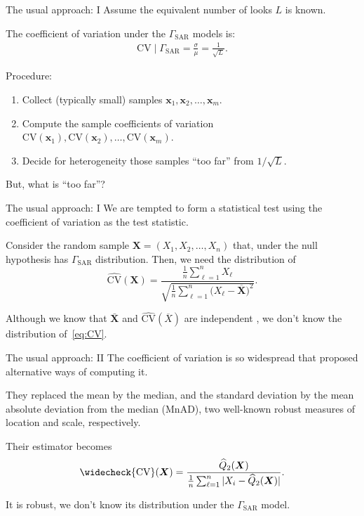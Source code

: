 \documentclass[table,aspectratio=169]{beamer}
\begin{document}
\begin{frame}{The usual approach: I}
Assume the equivalent number of looks $L$ is known.

The coefficient of variation under the $\Gamma_{\text{SAR}}$ models is:
\begin{align}
	\text{CV}\mid \Gamma_{\text{SAR}} =
	\frac{\sigma}{\mu} =
	 \frac{1}{\sqrt{L}}.
\end{align}

Procedure:
\begin{enumerate}
	\item Collect (typically small) samples $\bm x_1, \bm x_2, \dots, \bm x_m$.
	\item Compute the sample coefficients of variation $\text{CV}(\bm x_1),\text{CV}(\bm x_2), \dots, \text{CV}(\bm x_m)$.
	\item Decide for heterogeneity those samples ``too far'' from $1/\sqrt{L}$.
\end{enumerate}

But, what is ``too far''?
\end{frame}


\begin{frame}{The usual approach: I}
We are tempted to form a statistical test using the coefficient of variation as the test statistic.

Consider the random sample $\bm X=(X_1,X_2,\dots,X_n)$ that, under the null hypothesis has $\Gamma_{\text{SAR}}$ distribution.
Then, we need the distribution of
\begin{equation}
\widehat{\text{CV}}(\bm X) = \frac{\frac1n \sum_{\ell=1}^n X_\ell}{\sqrt{\frac1n \sum_{\ell=1}^n \big(X_\ell-\overline{\bm X}\big)^2}}.
\label{eq:CV}
\end{equation}

Although we know that $\bar{\bm X}$ and $\widehat{\text{CV}}(\overline X) $ are independent \citep{OnaCharacterizationoftheGammaDistributiontheIndependenceoftheSampleMeanandtheSampleCoefficientofVariation}, we don't know the distribution of~\eqref{eq:CV}.
\end{frame}

\begin{frame}{The usual approach: II}
The coefficient of variation is so widespread that \citet{Ospina2019} proposed alternative ways of computing it.

They replaced the mean by the median, and the standard deviation by the mean absolute deviation from the median (MnAD), two well-known robust measures of location and 
scale, respectively. 

Their estimator becomes
\begin{equation}
\widecheck{\text{CV}}(\bm X) = \frac{\widehat{Q}_2(\bm X)}{\frac1n \sum_{\ell=1}^n|X_i-\widehat{Q}_2(\bm X)|}.
\end{equation}

It is robust, we don't know its distribution under the $\Gamma_{\text{SAR}}$ model.
\end{frame}
\end{document}
